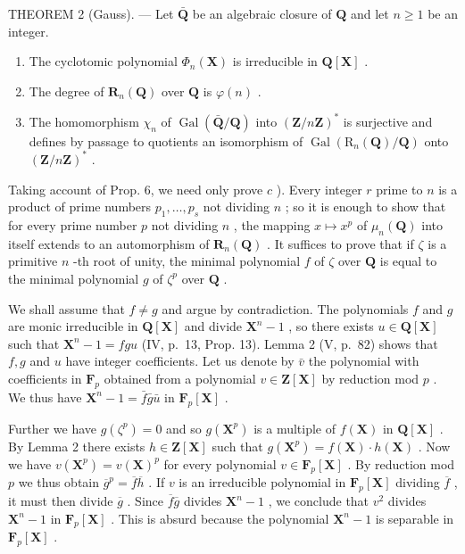 THEOREM 2 (Gauss). --- Let \(\bar{\mathbf{Q}}\) be an algebraic closure of \(\mathbf{Q}\) and let \(n \geqslant 1\) be an integer.

\begin{enumerate}
\def\labelenumi{\alph{enumi})}
\item
  The cyclotomic polynomial \(\Phi_n(\mathbf{X})\) is irreducible in \(\mathbf{Q}[\mathbf{X}]\) .
\item
  The degree of \(\mathbf{R}_n(\mathbf{Q})\) over \(\mathbf{Q}\) is \(\varphi(n)\) .
\item
  The homomorphism \(\chi_{n}\) of \(\operatorname{Gal}(\bar{\mathbf{Q}} / \mathbf{Q})\) into \((\mathbf{Z} / n\mathbf{Z})^{*}\) is surjective and defines by passage to quotients an isomorphism of \(\operatorname{Gal}(\mathrm{R}_n(\mathbf{Q}) / \mathbf{Q})\) onto \((\mathbf{Z} / n\mathbf{Z})^{*}\) .
\end{enumerate}

Taking account of Prop. 6, we need only prove \(c\) ). Every integer \(r\) prime to \(n\) is a product of prime numbers \(p_1, \ldots, p_s\) not dividing \(n\) ; so it is enough to show that for every prime number \(p\) not dividing \(n\) , the mapping \(x \mapsto x^p\) of \(\mu_n(\mathbf{Q})\) into itself extends to an automorphism of \(\mathbf{R}_n(\mathbf{Q})\) . It suffices to prove that if \(\zeta\) is a primitive \(n\) -th root of unity, the minimal polynomial \(f\) of \(\zeta\) over \(\mathbf{Q}\) is equal to the minimal polynomial \(g\) of \(\zeta^p\) over \(\mathbf{Q}\) .

We shall assume that \(f \neq g\) and argue by contradiction. The polynomials \(f\) and \(g\) are monic irreducible in \(\mathbf{Q}[\mathbf{X}]\) and divide \(\mathbf{X}^n - 1\) , so there exists \(u \in \mathbf{Q}[\mathbf{X}]\) such that \(\mathbf{X}^n - 1 = fgu\) (IV, p.~13, Prop. 13). Lemma 2 (V, p.~82) shows that \(f, g\) and \(u\) have integer coefficients. Let us denote by \(\bar{v}\) the polynomial with coefficients in \(\mathbf{F}_p\) obtained from a polynomial \(v \in \mathbf{Z}[\mathbf{X}]\) by reduction mod \(p\) . We thus have \(\mathbf{X}^n - 1 = \bar{f}\bar{g}\bar{u}\) in \(\mathbf{F}_p[\mathbf{X}]\) .

Further we have \(g(\zeta^p) = 0\) and so \(g(\mathbf{X}^p)\) is a multiple of \(f(\mathbf{X})\) in \(\mathbf{Q}[\mathbf{X}]\) . By Lemma 2 there exists \(h \in \mathbf{Z}[\mathbf{X}]\) such that \(g(\mathbf{X}^p) = f(\mathbf{X}) \cdot h(\mathbf{X})\) . Now we have \(v(\mathbf{X}^p) = v(\mathbf{X})^p\) for every polynomial \(v \in \mathbf{F}_p[\mathbf{X}]\) . By reduction mod \(p\) we thus obtain \(\overline{g}^p = \overline{f}\overline{h}\) . If \(v\) is an irreducible polynomial in \(\mathbf{F}_p[\mathbf{X}]\) dividing \(\overline{f}\) , it must then divide \(\overline{g}\) . Since \(\overline{f}\overline{g}\) divides \(\mathbf{X}^n - 1\) , we conclude that \(v^2\) divides \(\mathbf{X}^n - 1\) in \(\mathbf{F}_p[\mathbf{X}]\) . This is absurd because the polynomial \(\mathbf{X}^n - 1\) is separable in \(\mathbf{F}_p[\mathbf{X}]\) .

